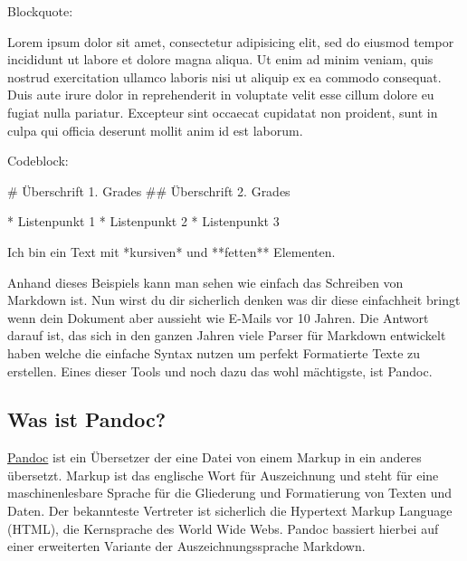 \documentclass[
    12pt,
    a4paper,
            ngerman,
        bibliography=totocnumbered,
    listof=totocnumbered
]{scrartcl}
\renewenvironment{quote}{\begin{customblockquote}\list{}{\rightmargin=0em\leftmargin=0em}%
\item\relax\color{blockquote-text}\ignorespaces}{\unskip\unskip\endlist\end{customblockquote}}
\newenvironment{Shaded}{}{}
\newcommand{\FunctionTok}[1]{\textcolor[rgb]{0.02,0.16,0.49}{#1}}
\newcommand{\NormalTok}[1]{#1}
\newcommand{\SpecialStringTok}[1]{\textcolor[rgb]{0.73,0.40,0.53}{#1}}
\begin{document}
Blockquote:

\begin{quote}
Lorem ipsum dolor sit amet, consectetur adipisicing elit, sed do eiusmod
tempor incididunt ut labore et dolore magna aliqua. Ut enim ad minim
veniam, quis nostrud exercitation ullamco laboris nisi ut aliquip ex ea
commodo consequat. Duis aute irure dolor in reprehenderit in voluptate
velit esse cillum dolore eu fugiat nulla pariatur. Excepteur sint
occaecat cupidatat non proident, sunt in culpa qui officia deserunt
mollit anim id est laborum.
\end{quote}

Codeblock:

\begin{Shaded}
\begin{Highlighting}[]
\FunctionTok{\# Überschrift 1. Grades}
\FunctionTok{\#\# Überschrift 2. Grades}

\SpecialStringTok{* }\NormalTok{Listenpunkt 1}
\SpecialStringTok{* }\NormalTok{Listenpunkt 2}
\SpecialStringTok{* }\NormalTok{Listenpunkt 3}

\NormalTok{Ich bin ein Text mit *kursiven* und **fetten** Elementen.}
\end{Highlighting}
\end{Shaded}

Anhand dieses Beispiels kann man sehen wie einfach das Schreiben von
Markdown ist. Nun wirst du dir sicherlich denken was dir diese
einfachheit bringt wenn dein Dokument aber aussieht wie E-Mails vor 10
Jahren. Die Antwort darauf ist, das sich in den ganzen Jahren viele
Parser für Markdown entwickelt haben welche die einfache Syntax nutzen
um perfekt Formatierte Texte zu erstellen. Eines dieser Tools und noch
dazu das wohl mächtigste, ist Pandoc.

\hypertarget{was-ist-pandoc}{%
\subsection{Was ist Pandoc?}\label{was-ist-pandoc}}

\href{http://pandoc.org/}{Pandoc} ist ein Übersetzer der eine Datei von
einem Markup in ein anderes übersetzt. Markup ist das englische Wort für
Auszeichnung und steht für eine maschinenlesbare Sprache für die
Gliederung und Formatierung von Texten und Daten. Der bekannteste
Vertreter ist sicherlich die Hypertext Markup Language (HTML), die
Kernsprache des World Wide Webs. Pandoc bassiert hierbei auf einer
erweiterten Variante der Auszeichnungssprache Markdown.
\end{document}
